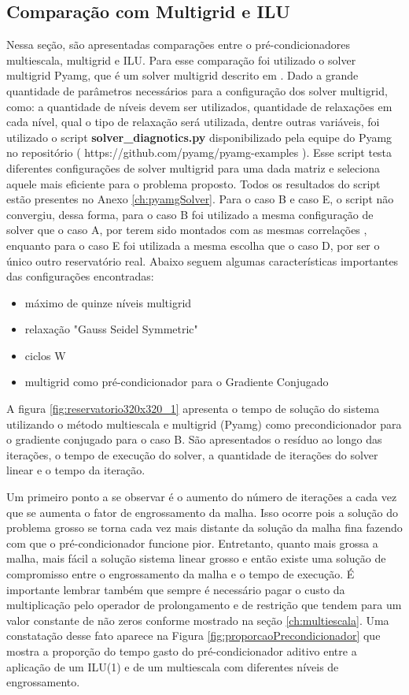 \subsection{Comparação com Multigrid e ILU}

Nessa seção, são apresentadas comparações entre o pré-condicionadores multiescala, multigrid e ILU. Para esse comparação foi utilizado o solver multigrid Pyamg, que é um solver multigrid  descrito em \cite{OlSc2018}. Dado a grande quantidade de parâmetros necessários para a configuração dos solver multigrid, como: a quantidade de níveis devem ser utilizados, quantidade de relaxações em cada nível, qual o tipo de relaxação será utilizada, dentre outras variáveis, foi utilizado o script \textbf{solver\_diagnotics.py} disponibilizado pela equipe do Pyamg no repositório ( https://github.com/pyamg/pyamg-examples ). Esse script testa diferentes configurações de solver multigrid para uma dada matriz e seleciona aquele mais eficiente para o problema proposto. Todos os resultados do script estão presentes no Anexo \ref{ch:pyamgSolver}. Para o caso B e caso E, o script não convergiu, dessa forma, para o caso B foi utilizado a mesma configuração de solver que o caso A, por terem sido montados com as mesmas correlações , enquanto para o caso E foi utilizada a mesma escolha que o caso D, por ser o único outro reservatório real. Abaixo seguem algumas características importantes das configurações encontradas:

\begin{itemize}
    \item máximo de quinze níveis multigrid
    \item relaxação "Gauss Seidel Symmetric" 
    \item ciclos W
    \item multigrid como pré-condicionador para o Gradiente Conjugado
\end{itemize}


A figura \ref{fig:reservatorio320x320_1} apresenta o tempo de solução do sistema utilizando o método multiescala e multigrid (Pyamg) como precondicionador para o gradiente conjugado para o caso B. São apresentados o resíduo ao longo das iterações, o tempo de execução do solver, a quantidade de iterações do solver linear e o tempo da iteração.


Um primeiro ponto a se observar é o aumento do número de iterações a cada vez que se aumenta o fator de engrossamento da malha. Isso ocorre pois a solução do problema grosso se torna cada vez mais distante da solução da malha fina fazendo com que o pré-condicionador funcione pior. Entretanto, quanto mais grossa a malha, mais fácil a solução sistema linear grosso e então existe uma solução de compromisso entre o engrossamento da malha e o tempo de execução. É importante lembrar também que sempre é necessário pagar o custo da multiplicação pelo operador de prolongamento e de restrição que tendem para um valor constante de não zeros conforme mostrado na seção \ref{ch:multiescala}. Uma constatação desse fato aparece na Figura \ref{fig:proporcaoPrecondicionador} que mostra a proporção do tempo gasto do pré-condicionador aditivo entre a aplicação de um ILU(1) e de um multiescala com diferentes níveis de engrossamento.


